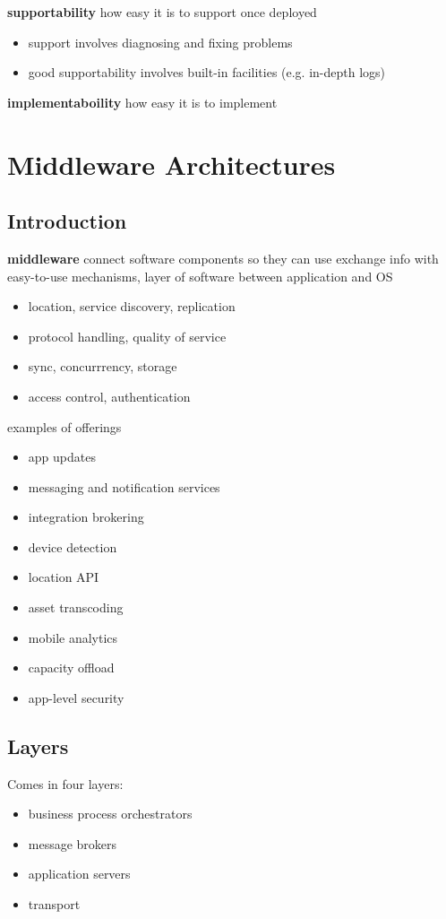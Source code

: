\documentclass[]{article}
\theoremstyle{definition}
\begin{document}
	\textbf{supportability} how easy it is to support once deployed
	\begin{itemize}
		\item support involves diagnosing and fixing problems
		\item good supportability involves built-in facilities (e.g. in-depth logs)
	\end{itemize}

	\textbf{implementaboility} how easy it is to implement

	\section{Middleware Architectures}
	\subsection{Introduction}
	\textbf{middleware} connect software components so they can use exchange info with easy-to-use mechanisms, layer of software between application and OS
	\begin{itemize}
		\item location, service discovery, replication
		\item protocol handling, quality of service
		\item sync, concurrrency, storage
		\item access control, authentication
	\end{itemize}
	examples of offerings
	\begin{itemize}
		\item app updates
		\item messaging and notification services
		\item integration brokering 
		\item device detection 
		\item location API
		\item asset transcoding
		\item mobile analytics
		\item capacity offload
		\item app-level security
	\end{itemize}

	\subsection{Layers}
	Comes in four layers:
	\begin{itemize}
		\item business process orchestrators
		\item message brokers
		\item application servers
		\item transport
	\end{itemize}
\end{document}
